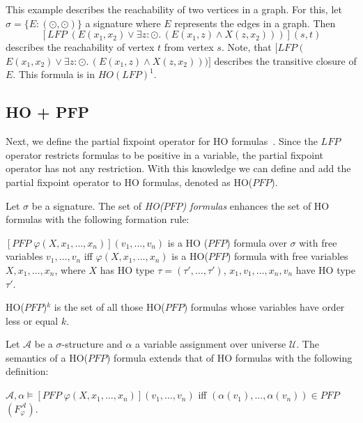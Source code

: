 \begin{example}{\cite{freireMartins2011descriptive}}
    \label{example:ho_lfp} This example describes the reachability of two
    vertices in a graph. For this, let $\sigma = \{E\colon(\odot, \odot)\}$ a signature where $E$ represents the
    edges in a graph. Then
    \[[LFP\;(E(x_1, x_2) \vee \exists z\colon\odot.\,(E(x_1, z) \wedge X(z, x_2)))](s, t)\]
    describes the reachability of vertex $t$ from vertex $s$. Note, that $[LFP\;($ $E(x_1, x_2) \vee
    \exists z\colon\odot.\,(E(x_1, z) \wedge X(z, x_2)))]$ describes the transitive closure of $E$. This formula is
    in $HO(LFP)^1$.
\end{example}

\subsection{HO + PFP}\label{subsec:ho+Pfp}

Next, we define the partial fixpoint operator for HO formulas~\cite{schewe2006fixpoint}. Since the
$\mathit{LFP}$ operator restricts formulas to be positive in a variable, the partial fixpoint operator has not any
restriction. With this knowledge we can define and
add the partial fixpoint operator to HO formulas, denoted as HO($\mathit{PFP}$).

\begin{definition}
    Let $\sigma$ be a signature. The set of \emph{HO($\mathit{PFP}$) formulas} enhances the set of HO formulas with the
    following formation rule:
    \begin{compactitem}
        \item $[\mathit{PFP}\;\varphi(X, x_1, \dots, x_n)](v_1, \dots, v_n)$ is a HO
        ($\mathit{PFP}$) formula over $\sigma$ with free variables $v_1, \dots, v_n$ iff $\varphi(X, x_1, \dots, x_n)
        $ is a HO($\mathit{PFP}$) formula with free variables $X, x_1, \dots, x_n$, where $X$ has HO type $\tau =
        (\tau', \dots, \tau')$, $x_1, v_1, \dots, x_n, v_n$ have HO type $\tau'$.
    \end{compactitem}
\end{definition}

HO($\mathit{PFP}$)$^k$ is the set of all those HO($\mathit{PFP}$) formulas whose variables have order less or equal $k$.

\begin{definition}
    Let $\mathcal{A}$ be a $\sigma$-structure and $\alpha$ a variable assignment over universe $\mathcal{U}$. The
    semantics of a HO($\mathit{PFP}$) formula extends that of HO formulas with the following definition:
    \begin{compactitem}
        \item $\mathcal{A}, \alpha \models [\mathit{PFP}\;\varphi(X, x_1, \dots, x_n)](v_1, \dots,
        v_n)$ iff $(\alpha(v_1), \dots, \alpha(v_n)) \in \mathit{PFP}$ $(F_\varphi^\mathcal{A})$.
    \end{compactitem}
\end{definition}

